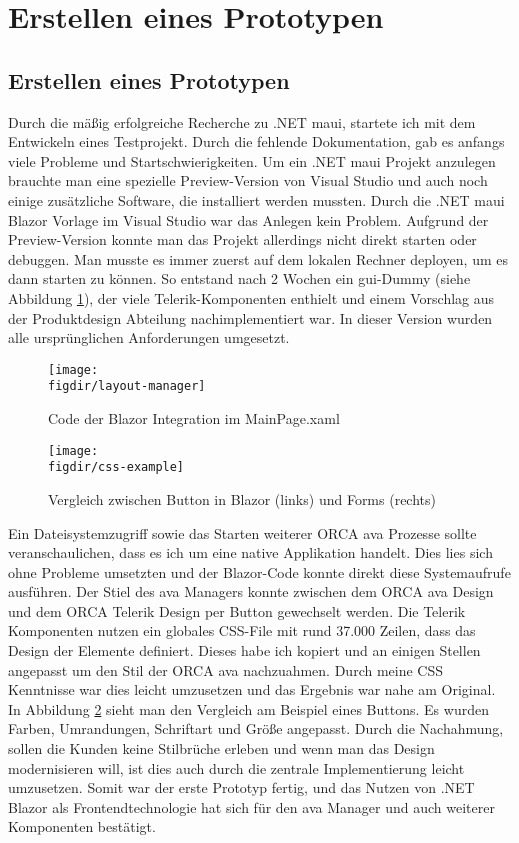 \section{Erstellen eines Prototypen}

\subsection{Erstellen eines Prototypen}
\label{chap:create-prototype}
Durch die mäßig erfolgreiche Recherche zu .NET \ac{maui}, startete ich mit dem Entwickeln eines Testprojekt. Durch die fehlende Dokumentation, gab es anfangs viele Probleme und Startschwierigkeiten. Um ein .NET \ac{maui} Projekt anzulegen brauchte man eine spezielle Preview-Version von Visual Studio und auch noch einige zusätzliche Software, die installiert werden mussten. Durch die .NET \ac{maui} Blazor Vorlage im Visual Studio war das Anlegen kein Problem. Aufgrund der Preview-Version konnte man das Projekt allerdings nicht direkt starten oder debuggen. Man musste es immer zuerst auf dem lokalen Rechner deployen, um es dann starten zu können. So entstand nach 2 Wochen ein \ac{gui}-Dummy (siehe Abbildung \ref{fig:layout-manager}), der viele Telerik-Komponenten enthielt und einem Vorschlag aus der Produktdesign Abteilung nachimplementiert war. In dieser Version wurden alle ursprünglichen Anforderungen umgesetzt. 

\begin{figure}[h]
	\centering
	{\caption{Code der Blazor Integration im MainPage.xaml}
		\label{fig:layout-manager}}
	{\texttt{[image: \\figdir/layout-manager]}}
\end{figure}

\begin{figure}[h]
	\centering
	{\caption{Vergleich zwischen Button in Blazor (links) und Forms (rechts) }
		\label{fig:css-example}}
	{\texttt{[image: \\figdir/css-example]}}
\end{figure}

Ein Dateisystemzugriff sowie das Starten weiterer ORCA \ac{ava} Prozesse sollte veranschaulichen, dass es ich um eine native Applikation handelt. Dies lies sich ohne Probleme umsetzten und der Blazor-Code konnte direkt diese Systemaufrufe ausführen.
Der Stiel des \ac{ava} Managers konnte zwischen dem ORCA \ac{ava} Design und dem ORCA Telerik Design per Button gewechselt werden. Die Telerik Komponenten nutzen ein globales CSS-File mit rund 37.000 Zeilen, dass das Design der Elemente definiert. Dieses habe ich kopiert und an einigen Stellen angepasst um den Stil der ORCA \ac{ava} nachzuahmen. Durch meine CSS Kenntnisse war dies leicht umzusetzen und das Ergebnis war nahe am Original. In Abbildung \ref{fig:css-example} sieht man den Vergleich am Beispiel eines Buttons. Es wurden Farben, Umrandungen, Schriftart und Größe angepasst.
Durch die Nachahmung, sollen die Kunden keine Stilbrüche erleben und wenn man das Design modernisieren will, ist dies auch durch die zentrale Implementierung leicht umzusetzen.
Somit war der erste Prototyp fertig, und das Nutzen von .NET Blazor als Frontendtechnologie hat sich für den \ac{ava} Manager und auch weiterer Komponenten bestätigt.

